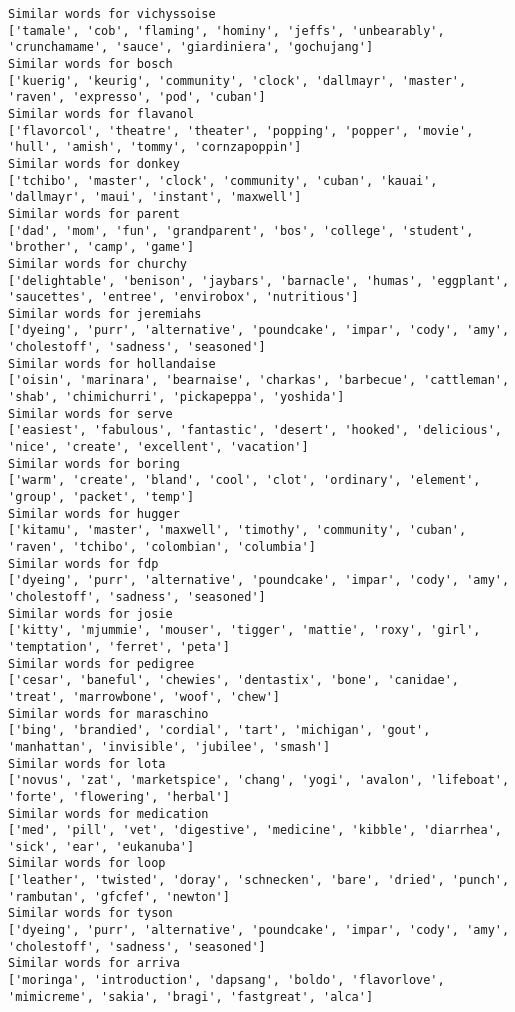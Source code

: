 \documentclass[11pt]{article}
\begin{document}
\begin{Verbatim}[commandchars=\\\{\}]
Similar words for vichyssoise
['tamale', 'cob', 'flaming', 'hominy', 'jeffs', 'unbearably', 'crunchamame', 'sauce', 'giardiniera', 'gochujang']
Similar words for bosch
['kuerig', 'keurig', 'community', 'clock', 'dallmayr', 'master', 'raven', 'expresso', 'pod', 'cuban']
Similar words for flavanol
['flavorcol', 'theatre', 'theater', 'popping', 'popper', 'movie', 'hull', 'amish', 'tommy', 'cornzapoppin']
Similar words for donkey
['tchibo', 'master', 'clock', 'community', 'cuban', 'kauai', 'dallmayr', 'maui', 'instant', 'maxwell']
Similar words for parent
['dad', 'mom', 'fun', 'grandparent', 'bos', 'college', 'student', 'brother', 'camp', 'game']
Similar words for churchy
['delightable', 'benison', 'jaybars', 'barnacle', 'humas', 'eggplant', 'saucettes', 'entree', 'envirobox', 'nutritious']
Similar words for jeremiahs
['dyeing', 'purr', 'alternative', 'poundcake', 'impar', 'cody', 'amy', 'cholestoff', 'sadness', 'seasoned']
Similar words for hollandaise
['oisin', 'marinara', 'bearnaise', 'charkas', 'barbecue', 'cattleman', 'shab', 'chimichurri', 'pickapeppa', 'yoshida']
Similar words for serve
['easiest', 'fabulous', 'fantastic', 'desert', 'hooked', 'delicious', 'nice', 'create', 'excellent', 'vacation']
Similar words for boring
['warm', 'create', 'bland', 'cool', 'clot', 'ordinary', 'element', 'group', 'packet', 'temp']
Similar words for hugger
['kitamu', 'master', 'maxwell', 'timothy', 'community', 'cuban', 'raven', 'tchibo', 'colombian', 'columbia']
Similar words for fdp
['dyeing', 'purr', 'alternative', 'poundcake', 'impar', 'cody', 'amy', 'cholestoff', 'sadness', 'seasoned']
Similar words for josie
['kitty', 'mjummie', 'mouser', 'tigger', 'mattie', 'roxy', 'girl', 'temptation', 'ferret', 'peta']
Similar words for pedigree
['cesar', 'baneful', 'chewies', 'dentastix', 'bone', 'canidae', 'treat', 'marrowbone', 'woof', 'chew']
Similar words for maraschino
['bing', 'brandied', 'cordial', 'tart', 'michigan', 'gout', 'manhattan', 'invisible', 'jubilee', 'smash']
Similar words for lota
['novus', 'zat', 'marketspice', 'chang', 'yogi', 'avalon', 'lifeboat', 'forte', 'flowering', 'herbal']
Similar words for medication
['med', 'pill', 'vet', 'digestive', 'medicine', 'kibble', 'diarrhea', 'sick', 'ear', 'eukanuba']
Similar words for loop
['leather', 'twisted', 'doray', 'schnecken', 'bare', 'dried', 'punch', 'rambutan', 'gfcfef', 'newton']
Similar words for tyson
['dyeing', 'purr', 'alternative', 'poundcake', 'impar', 'cody', 'amy', 'cholestoff', 'sadness', 'seasoned']
Similar words for arriva
['moringa', 'introduction', 'dapsang', 'boldo', 'flavorlove', 'mimicreme', 'sakia', 'bragi', 'fastgreat', 'alca']

\end{Verbatim}
\end{document}
